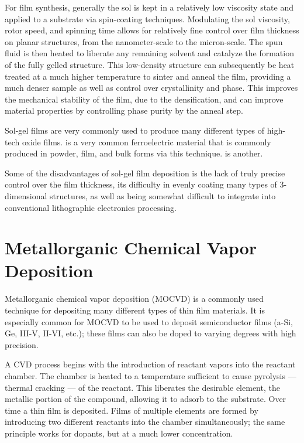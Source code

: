 For film synthesis, generally the sol is kept in a relatively low viscosity state and applied to a substrate via spin-coating techniques. Modulating the sol viscosity, rotor speed, and spinning time allows for relatively fine control over film thickness on planar structures, from the nanometer-scale to the micron-scale. The spun fluid is then heated to liberate any remaining solvent and catalyze the formation of the fully gelled structure. This low-density structure can subsequently be heat treated at a much higher temperature to sinter and anneal the film, providing a much denser sample as well as control over crystallinity and phase. This improves the mechanical stability of the film, due to the densification, and can improve material properties by controlling phase purity by the anneal step. \cite{brinker_sol-gel_1990,Fred_Al2O3_powders_1996,hanaor_solgel_tio2_2011,Yoldas_1979}

Sol-gel films are very commonly used to produce many different types of high-tech oxide films. \cite{Takashi_1994} is a very common ferroelectric material that is commonly produced in powder, film, and bulk forms via this technique.  is another.\cite{Tahan_1996}

Some of the disadvantages of sol-gel film deposition is the lack of truly precise control over the film thickness, its difficulty in evenly coating many types of 3-dimensional structures, as well as being somewhat difficult to integrate into conventional lithographic electronics processing.\cite{brinker_sol-gel_1990,Fred_Al2O3_powders_1996,hanaor_solgel_tio2_2011,Yoldas_1979} 


\section{Metallorganic Chemical Vapor Deposition}
\label{sec:Synth-MOCVD}

Metallorganic chemical vapor deposition (MOCVD) is a commonly used technique for depositing many different types of thin film materials. It is especially common for MOCVD to be used to deposit semiconductor films (a-Si, Ge, III-V, II-VI, etc.); these films can also be doped to varying degrees with high precision.\cite{Malshe_1999,Matsumara_1998,Muralt_2000}

A CVD process begins with the introduction of reactant vapors into the reactant chamber. The chamber is heated to a temperature sufficient to cause pyrolysis --- thermal cracking --- of the reactant. This liberates the desirable element, the metallic portion of the compound, allowing it to adsorb to the substrate. Over time a thin film is deposited. Films of multiple elements are formed by introducing two different reactants into the chamber simultaneously; the same principle works for dopants, but at a much lower concentration.\cite{Malshe_1999,Matsumara_1998,Muralt_2000} 

